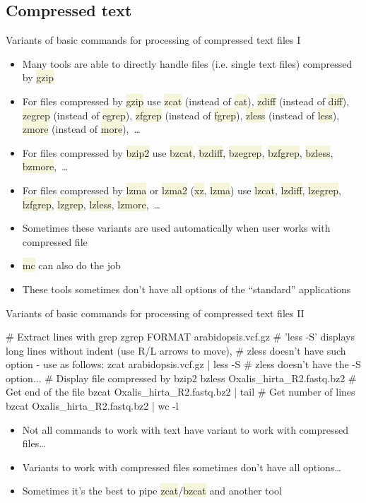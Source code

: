\documentclass[compress, xelatex, 11pt, xcolor=svgnames, aspectratio=169,
	hyperref={
		bookmarks=true,
		unicode=true,
		colorlinks=true,
		pdftitle={Linux, command line and MetaCentrum},
		plainpages=false,
		pdfauthor={Vojtech Zeisek},
		pdfsubject={Course about use of Linux command line, writing shell scripts and using MetaCentrum of CESNET},
		pdfcreator={XeLaTeX},
		pdfkeywords={Linux, GNU, BASH, shell, command line, MetaCentrum},
		linkcolor=DarkRed, %
		anchorcolor=DarkBlue, %
		citecolor=Indigo, %
		filecolor=NavyBlue, %
		menucolor=DarkMagenta, %
		urlcolor=DarkBlue, %
		},
	url={hyphens, lowtilde} %
	]{beamer}
\renewcommand{\texttt}[1]{\colorbox{Beige}{{\ttfamily #1}}}
\begin{document}
\subsection{Compressed text}

\begin{frame}{Variants of basic commands for processing of compressed text files I}
	\begin{itemize}
		\item Many tools are able to directly handle files (i.e. single text files) compressed by \texttt{gzip}
		\item For files compressed by \texttt{gzip} use \texttt{zcat} (instead of \texttt{cat}), \texttt{zdiff} (instead of \texttt{diff}), \texttt{zegrep} (instead of \texttt{egrep}), \texttt{zfgrep} (instead of \texttt{fgrep}), \texttt{zless} (instead of \texttt{less}), \texttt{zmore} (instead of \texttt{more}),~\ldots
		\item For files compressed by \texttt{bzip2} use \texttt{bzcat}, \texttt{bzdiff}, \texttt{bzegrep}, \texttt{bzfgrep}, \texttt{bzless}, \texttt{bzmore},~\ldots
		\item For files compressed by \texttt{lzma} or \texttt{lzma2} (\texttt{xz}, \texttt{lzma}) use \texttt{lzcat}, \texttt{lzdiff}, \texttt{lzegrep}, \texttt{lzfgrep}, \texttt{lzgrep}, \texttt{lzless}, \texttt{lzmore},~\ldots
		\item Sometimes these variants are used automatically when user works with compressed file
		\item \texttt{mc} can also do the job
		\item These tools sometimes don't have all options of the \enquote{standard} applications
	\end{itemize}
\end{frame}

\begin{frame}[fragile]{Variants of basic commands for processing of compressed text files II}
	\begin{bashcode}
    # Extract lines with grep
    zgrep FORMAT arabidopsis.vcf.gz
    # 'less -S' displays long lines without indent (use R/L arrows to move),
    # zless doesn't have such option - use as follows:
    zcat arabidopsis.vcf.gz | less -S # zless doesn't have the -S option...
    # Display file compressed by bzip2
    bzless Oxalis_hirta_R2.fastq.bz2
    # Get end of the file
    bzcat Oxalis_hirta_R2.fastq.bz2 | tail
    # Get number of lines
    bzcat Oxalis_hirta_R2.fastq.bz2 | wc -l
	\end{bashcode}
	\begin{itemize}
		\item Not all commands to work with text have variant to work with compressed files\ldots
		\item Variants to work with compressed files sometimes don't have all options\ldots
		\item Sometimes it's the best to pipe \texttt{zcat}/\texttt{bzcat} and another tool
	\end{itemize}
\end{frame}
\end{document}
